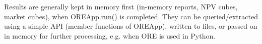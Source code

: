 \documentclass[12pt, a4paper]{report}
\begin{document}
Results are generally kept in memory first (in-memory reports, NPV cubes, market cubes), when
OREApp.run() is completed. They can be queried/extracted using a simple API (member
functions of OREApp), written to files, or passed on in memory for further processing, e.g. when
ORE is used in Python.







%

\end{document}
